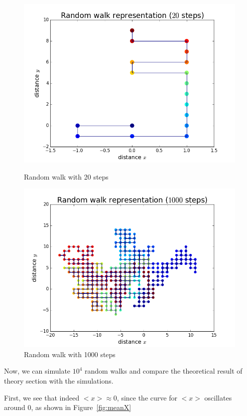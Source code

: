 \documentclass[12pt]{article}
\begin{document}
\begin{figure}[!htb]
  \includegraphics[width=\linewidth]{rWalk1.png}
  \caption{Random walk with 20 steps}\label{fig:20steps}
\endminipage\hfill
{}
  \includegraphics[width=\linewidth]{rWalk2.png}
  \caption{Random walk with 1000 steps}\label{fig:1000steps}
\endminipage\hfill
\end{figure}


Now, we can simulate $10^4$ random walks and compare the theoretical result of theory section with the simulations. 

First, we see that indeed $<x>\approx 0$, since the curve for $<x>$ oscillates around 0, as shown in Figure~\ref{fig:meanX}
\end{document}
